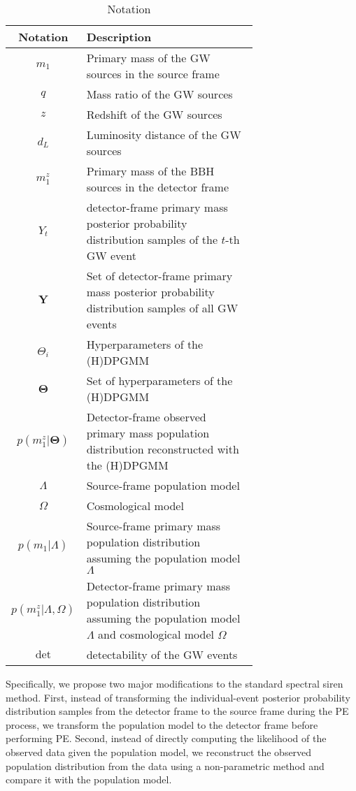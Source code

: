 \documentclass[twocolumn]{aastex631}
\begin{document}
\begin{table}[h]
    \caption{Notation}
    \begin{ruledtabular}
        \begin{tabular}{c>{\raggedright\arraybackslash}p{0.7\linewidth}}
            Notation & Description \\
            \hline
            $m_1$ & Primary mass of the \ac{GW} sources in the source frame \\
            $q$ & Mass ratio of the \ac{GW} sources \\
            $z$ & Redshift of the \ac{GW} sources \\
            $d_L$ & Luminosity distance of the \ac{GW} sources \\
            $m^z_1$ & Primary mass of the \ac{BBH} sources in the detector frame \\
            $Y_t$ & detector-frame primary mass posterior probability distribution samples of the $t$-th \ac{GW} event \\
            $\mathbf{Y}$ & Set of detector-frame primary mass posterior probability distribution samples of all \ac{GW} events \\
            $\Theta_i$ & Hyperparameters of the \ac{(H)DPGMM} \\
            $\mathbf{\Theta}$ & Set of hyperparameters of the \ac{(H)DPGMM} \\
            $p(m^z_1|\mathbf{\Theta})$ & Detector-frame observed primary mass population distribution reconstructed with the \ac{(H)DPGMM} \\
            $\Lambda$ & Source-frame population model \\
            $\Omega$ & Cosmological model \\
            $p(m_1|\Lambda)$ & Source-frame primary mass population distribution assuming the population model $\Lambda$ \\
            $p(m^z_1|\Lambda, \Omega)$ & Detector-frame primary mass population distribution assuming the population model $\Lambda$ and cosmological model $\Omega$ \\
            $\mathrm{det}$ & detectability of the \ac{GW} events \\
        \end{tabular}
    \end{ruledtabular}
    \label{tab:notation}
\end{table}

Specifically, we propose two major modifications to the standard spectral siren method.
First, instead of transforming the individual-event posterior probability distribution samples from the detector frame to the source frame during the \ac{PE} process, we transform the population model to the detector frame before performing \ac{PE}.
Second, instead of directly computing the likelihood of the observed data given the population model, we reconstruct the observed population distribution from the data using a non-parametric method and compare it with the population model.
\end{document}

